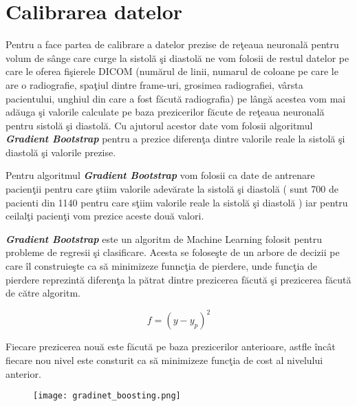 \section{Calibrarea datelor}

Pentru a face partea de calibrare a datelor prezise de re\c{t}eaua neuronal\u{a} pentru volum de s\^{a}nge care curge la sistol\u{a} \c{s}i diastol\u{a} ne vom folosii de restul datelor pe care le oferea fi\c{s}ierele DICOM (num\u{a}rul de linii, numarul de coloane pe care le are o radiografie, spa\c{t}iul dintre frame-uri, grosimea radiografiei, v\^{a}rsta pacientului, unghiul din care a fost f\u{a}cut\u{a} radiografia) pe l\^{a}ng\u{a} acestea vom mai ad\u{a}uga \c{s}i valorile calculate pe baza prezicerilor f\u{a}cute de re\c{t}eaua neuronal\u{a} pentru sistol\u{a} \c{s}i diastol\u{a}. Cu ajutorul acestor date vom folosii algoritmul \textbf{\textit{Gradient Bootstrap}} pentru a prezice diferen\c{t}a dintre valorile reale la sistol\u{a} \c{s}i diastol\u{a} \c{s}i valorile prezise.

\par

Pentru algoritmul \textbf{\textit{Gradient Bootstrap}} vom folosii ca date de antrenare pacien\c{t}ii pentru care \c{s}tiim valorile adev\u{a}rate la sistol\u{a} \c{s}i diastol\u{a} ( sunt 700 de pacienti din 1140 pentru care s\c{t}iim valorile reale la sistol\u{a} \c{s}i diastol\u{a} ) iar pentru ceilal\c{t}i pacien\c{t}i vom prezice aceste dou\u{a} valori.

\par

\textbf{\textit{Gradient Bootstrap}} este un algoritm de Machine Learning folosit pentru probleme de regresii \c{s}i clasificare. Acesta se folose\c{s}te de un arbore de decizii pe care \^{i}l construie\c{s}te ca s\u{a} minimizeze funnc\c{t}ia de pierdere, unde func\c{t}ia de pierdere reprezint\u{a} diferen\c{t}a la p\u{a}trat dintre prezicerea f\u{a}cut\u{a} \c{s}i prezicerea f\u{a}cut\u{a} de c\u{a}tre algoritm.

$$ f = (y - y_p )^2 $$

Fiecare prezicerea nou\u{a} este f\u{a}cut\u{a} pe baza prezicerilor anterioare, astfle \^{i}nc\^{a}t fiecare nou nivel este consturit ca s\u{a} minimizeze func\c{t}ia de cost al nivelului anterior.

\begin{figure}[h!]
  \center
  \texttt{[image: gradinet\_boosting.png]}  
\end{figure}

